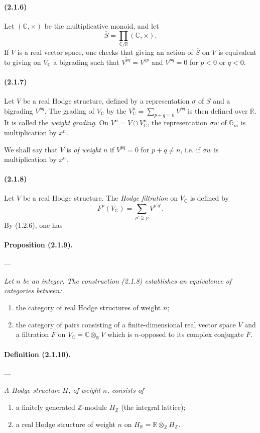 \documentclass[10pt]{article}
\newcommand{\C}{\mathbb C}
\newcommand{\Z}{\mathbb Z}
\newcommand{\fg}{\guillemotright}
\newcommand{\og}{\guillemotleft}
\newcommand{\R}{\mathbb R}
\newcommand{\Gm}{\mathbb G_m}
\begin{document}
\paragraph{(2.1.6)} Let $(\C,\times)$ be the multiplicative monoid, and let
\[
\overline S=\prod_{\C/\R}(\C,\times).
\]
If $V$ is a real vector space, one checks that giving an action of $\overline S$ on $V$ is equivalent to giving on $V_\C$ a bigrading such that $\overline{V^{pq}}=V^{qp}$ and $V^{pq}=0$ for $p<0$ or $q<0$.

\paragraph{(2.1.7)} Let $V$ be a real Hodge structure, defined by a representation $\sigma$ of $S$ and a bigrading $V^{pq}$. The grading of $V_\C$ by the $V_\C^n=\sum_{p+q=n}V^{pq}$ is then defined over $\R$. It is called the \emph{weight grading}. On $V^n=V\cap V_\C^n$, the representation $\sigma w$ of $\Gm$ is multiplication by $x^n$.

We shall say that $V$ is \emph{of weight $n$} if $V^{pq}=0$ for $p+q\ne n$, i.e. if $\sigma w$ is multiplication by $x^n$.

\paragraph{(2.1.8)} Let $V$ be a real Hodge structure. The \emph{Hodge filtration} on $V_\C$ is defined by
\[
F^p(V_\C)=\sum_{p'\ge p}V^{p'q'}.
\]
By (1.2.6), one has

\paragraph{Proposition (2.1.9).} --- {\itshape Let $n$ be an integer. The construction (2.1.8) establishes an equivalence of categories between:
\begin{enumerate}[label=\alph*)]
\item the category of real Hodge structures of weight $n$;
\item the category of pairs consisting of a finite-dimensional real vector space $V$ and a filtration $F$ on $V_\C=\C\otimes_\R V$ which is $n$-opposed to its complex conjugate $\overline F$.
\end{enumerate}}

\paragraph{Definition (2.1.10).} --- {\itshape A Hodge structure $H$, of weight $n$, consists of
\begin{enumerate}[label=\alph*)]
\item a finitely generated $\Z$-module $H_\Z$ (the \og integral lattice\fg{});
\item a real Hodge structure of weight $n$ on $H_\R=\R\otimes_\Z H_\Z$.
\end{enumerate}}
\end{document}
